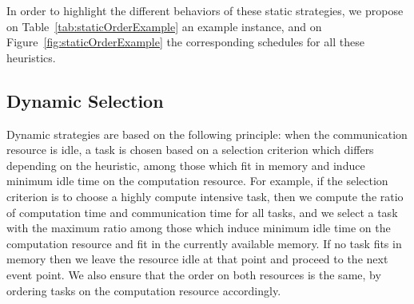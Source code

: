 \documentclass[sigconf]{acmart}
\begin{document}
	In order to highlight the different behaviors of these static strategies, we propose on Table~\ref{tab:staticOrderExample} an example instance, and on Figure~\ref{fig:staticOrderExample} the corresponding schedules for all these heuristics.
	
	
	
	
	\subsection{Dynamic Selection}
	Dynamic strategies are based on the following principle: when the communication resource is idle, a task is chosen based on a selection criterion which differs depending on the heuristic, among those which fit in memory and induce minimum idle time on the computation resource.  For example, if the selection criterion is to choose a highly compute intensive task, then we compute the ratio of computation time and communication time for all tasks, and we select a task with the maximum ratio among those which induce minimum idle time on the computation resource and fit in the currently available memory. If no task fits in memory then we leave the resource idle at that point and proceed to the next event point. We also ensure that the order on both resources is the same, by ordering tasks on the computation resource accordingly.
	
	
	
	
\end{document}
